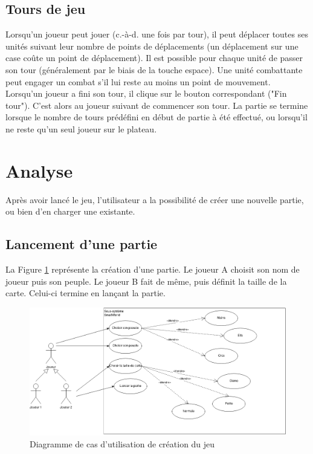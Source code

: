 \documentclass[a4paper]{article}
\begin{document}
\subsection{Tours de jeu}
Lorsqu’un joueur peut jouer (c.-à-d. une fois par tour), il peut déplacer toutes ses unités suivant leur nombre de points de déplacements (un déplacement sur une case coûte un point de déplacement). Il est possible pour chaque unité de passer son tour (généralement par le biais de la touche espace). Une unité combattante peut engager un combat s’il lui reste au moins un point de mouvement. Lorsqu’un joueur a fini son tour, il clique sur le bouton correspondant ("Fin tour"). C’est alors au joueur suivant de commencer son tour. La partie se termine lorsque le nombre de tours prédéfini en début de partie à été effectué, ou lorsqu’il ne reste qu’un seul joueur sur le plateau.

\section{Analyse}
	
Après avoir lancé le jeu, l'utilisateur a la possibilité de créer une nouvelle partie, ou bien d'en charger une existante.
	
	\subsection{Lancement d'une partie}
La Figure \ref{fig:cas_creation} représente la création d'une partie. Le joueur A choisit son nom de joueur puis son peuple. Le joueur B fait de même, puis définit la taille de la carte. Celui-ci termine en lançant la partie.

\begin{figure}[ht]
\centering
	\includegraphics[width=1\textwidth]{../Schemas/CU_Creation.png}
		\caption{Diagramme de cas d'utilisation de création du jeu}
		\label{fig:cas_creation}
\end{figure}
\end{document}
